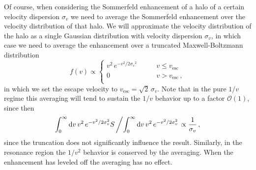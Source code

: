 \documentclass[aps,prd,twocolumn,amsmath,amssymb,floatfix,nofootinbib,10pt]{revtex4}
\newcommand{\somm}{\ensuremath{S}}
\newcommand{\dd}{\mathrm{d}}
\newcommand{\order}{\ensuremath{\mathcal{O}}}
\newcommand{\sigv}{\ensuremath{\sigma_v}}
\begin{document}
Of course, when considering the Sommerfeld enhancement of a halo of a
certain velocity dispersion $\sigv$ we need to average the Sommerfeld
enhancement over the velocity distribution of that halo. We will
approximate the velocity distribution of the halo as a single Gaussian
distribution with velocity dispersion $\sigv$, in which case we need
to average the enhancement over a truncated Maxwell-Boltzmann
distribution
\begin{equation}\label{eq:maxboltz}
f(v) \propto \left\{
\begin{array}{rl}
v^2\, e^{-v^2/2\sigv^2}  & \qquad v \leq v_{\mathrm{esc}}\\
0 & \qquad v > v_{\mathrm{esc}}\, ,\\
\end{array} \right.
\end{equation}
in which we set the escape velocity to $v_{\mathrm{esc}} =
\sqrt{2}\,\sigv$. Note that in the pure $1/v$ regime this averaging
will tend to sustain the $1/v$ behavior up to a factor $\order(1)$,
since then
\begin{equation}
\int_0^\infty \dd v \, v^2\, e^{-v^2/2\sigv^2}
\somm\left/\int_0^\infty \dd v \, v^2\, e^{-v^2/2\sigv^2} \right.\propto
\frac{1}{\sigv}\, ,
\end{equation}
since the truncation does not significantly influence the
result. Similarly, in the resonance region the $1/v^2$ behavior is
conserved by the averaging. When the enhancement has leveled off the
averaging has no effect.
\end{document}
